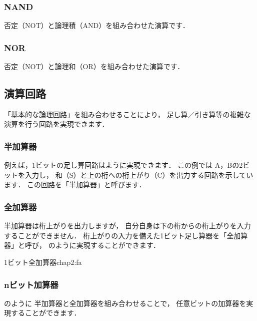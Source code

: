 \subsubsection{NAND}
否定（NOT）と論理積（AND）を組み合わせた演算です．
\begin{center}
\end{center}

\subsubsection{NOR}
否定（NOT）と論理和（OR）を組み合わせた演算です．
\begin{center}
\end{center}

\subsection{演算回路}
「基本的な論理回路」を組み合わせることにより，
足し算／引き算等の複雑な演算を行う回路を実現できます．

\subsubsection{半加算器}
例えば，1ビットの足し算回路はように実現できます．
この例では A，Bの2ビットを入力し，
和（S）と上の桁への桁上がり（C）を出力する回路を示しています．
この回路を「半加算器」と呼びます．


\subsubsection{全加算器}
半加算器は桁上がりを出力しますが，
自分自身は下の桁からの桁上がりを入力することができません．
桁上がりの入力を備えた1ビット足し算器を「全加算器」と呼び，
のように実現することができます．

          {1ビット全加算器}{chap2:fa}

\subsubsection{nビット加算器}
のように
半加算器と全加算器を組み合わせることで，
任意ビットの加算器を実現することができます．

